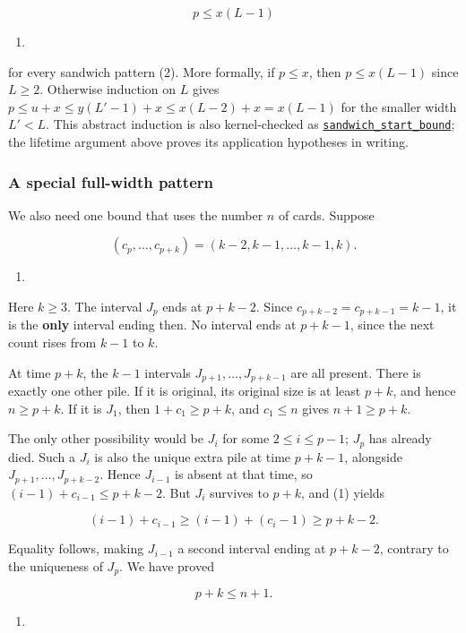 \documentclass[11pt,a4paper]{article}
\providecommand{\tightlist}{\setlength{\itemsep}{0pt}\setlength{\parskip}{0pt}}
\begin{document}
\[
\boxed{p\le x(L-1)}
\]

\begin{enumerate}
\def\labelenumi{(\arabic{enumi})}
\setcounter{enumi}{5}
\tightlist
\item
\end{enumerate}

for every sandwich pattern (2). More formally, if \(p\le x\), then \(p\le x(L-1)\) since \(L\ge2\). Otherwise induction on \(L\) gives \(p\le u+x\le y(L'-1)+x\le x(L-2)+x=x(L-1)\) for the smaller width \(L'<L\). This abstract induction is also kernel-checked as \href{https://github.com/mpelteshki/climbing-to-the-frontier/blob/212bba53b1818c08c40b8c4b48f636651eaf6410/cagent/p3/lean/ProofPursuit/P3/C2SandwichBound.lean}{\texttt{sandwich\_start\_bound}}; the lifetime argument above proves its application hypotheses in writing.

\subsubsection{A special full-width pattern}\label{a-special-full-width-pattern}

We also need one bound that uses the number \(n\) of cards. Suppose

\[
(c_p,\ldots,c_{p+k})=(k-2,k-1,\ldots,k-1,k).
\]

\begin{enumerate}
\def\labelenumi{(\arabic{enumi})}
\setcounter{enumi}{6}
\tightlist
\item
\end{enumerate}

Here \(k\ge3\). The interval \(J_p\) ends at \(p+k-2\). Since \(c_{p+k-2}=c_{p+k-1}=k-1\), it is the \textbf{only} interval ending then. No interval ends at \(p+k-1\), since the next count rises from \(k-1\) to \(k\).

At time \(p+k\), the \(k-1\) intervals \(J_{p+1},\ldots,J_{p+k-1}\) are all present. There is exactly one other pile. If it is original, its original size is at least \(p+k\), and hence \(n\ge p+k\). If it is \(J_1\), then \(1+c_1\ge p+k\), and \(c_1\le n\) gives \(n+1\ge p+k\).

The only other possibility would be \(J_i\) for some \(2\le i\le p-1\); \(J_p\) has already died. Such a \(J_i\) is also the unique extra pile at time \(p+k-1\), alongside \(J_{p+1},\ldots,J_{p+k-2}\). Hence \(J_{i-1}\) is absent at that time, so \((i-1)+c_{i-1}\le p+k-2\). But \(J_i\) survives to \(p+k\), and (1) yields

\[
(i-1)+c_{i-1}\ge(i-1)+(c_i-1)\ge p+k-2.
\]

Equality follows, making \(J_{i-1}\) a second interval ending at \(p+k-2\), contrary to the uniqueness of \(J_p\). We have proved

\[
\boxed{p+k\le n+1}.
\]

\begin{enumerate}
\def\labelenumi{(\arabic{enumi})}
\setcounter{enumi}{7}
\tightlist
\item
\end{enumerate}
\end{document}
